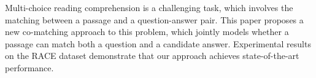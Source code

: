 Multi-choice reading comprehension is a challenging task, which involves the matching between a passage and a question-answer pair. This paper proposes a new co-matching approach to this problem, which jointly models whether a passage can match both a question and a candidate answer. Experimental results on the RACE dataset demonstrate that our approach achieves state-of-the-art performance.
